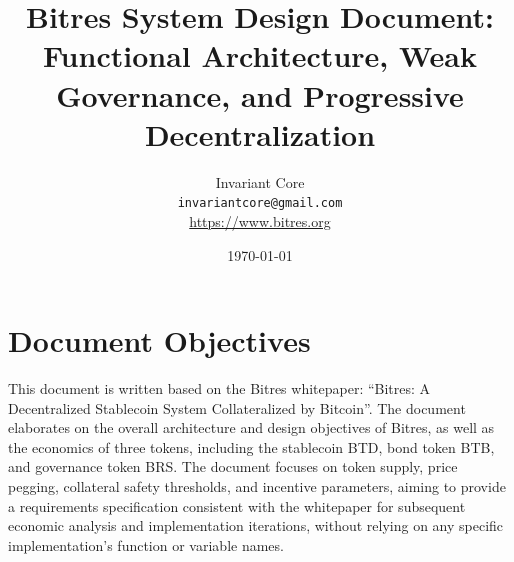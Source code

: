 \documentclass{article}
\title{Bitres System Design Document: Functional Architecture, Weak Governance, and Progressive Decentralization}
\author{Invariant Core\\
\texttt{invariantcore@gmail.com}\\
\url{https://www.bitres.org}}
\date{\today}
\begin{document}
\maketitle

\section{Document Objectives}
This document is written based on the Bitres whitepaper: ``Bitres: A Decentralized Stablecoin System Collateralized by Bitcoin''. The document elaborates on the overall architecture and design objectives of Bitres, as well as the economics of three tokens, including the stablecoin BTD, bond token BTB, and governance token BRS. The document focuses on token supply, price pegging, collateral safety thresholds, and incentive parameters, aiming to provide a requirements specification consistent with the whitepaper for subsequent economic analysis and implementation iterations, without relying on any specific implementation's function or variable names.
\end{document}
